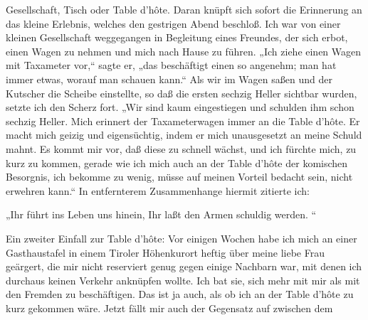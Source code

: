 \documentclass[twoside=true,titlepage=false,open=any, parskip=never, fontsize=10pt, headings=small, chapterprefix=false, appendixprefix=false]{scrbook}
\begin{document}
            
        \pstart
        Gesellschaft, Tisch oder Table d’hôte. Daran
               knüpft sich sofort die Erinnerung an das kleine Erlebnis, welches den
               gestrigen Abend beschloß. Ich war von einer kleinen Gesellschaft weggegangen in
               Begleitung eines Freundes, der sich erbot, einen Wagen zu nehmen und mich nach
               Hause zu führen. „Ich ziehe einen Wagen mit Taxameter vor,“ sagte er, „das
               beschäftigt einen so angenehm; man hat immer etwas, worauf man schauen
               kann.“ Als wir im Wagen saßen und der Kutscher die Scheibe einstellte, so daß
               die ersten sechzig Heller sichtbar wurden, setzte ich den Scherz fort. „Wir sind
               kaum eingestiegen und schulden ihm schon sechzig Heller. Mich erinnert der
               Taxameterwagen immer an die Table d’hôte. Er
               macht mich geizig und eigensüchtig, indem er mich unausgesetzt an
               meine Schuld mahnt. Es kommt mir vor, daß diese zu schnell wächst, und ich
               fürchte mich, zu kurz zu kommen, gerade wie ich mich auch an der
               Table d’hôte der komischen Besorgnis, ich bekomme zu
               wenig, müsse auf meinen Vorteil bedacht sein, nicht erwehren kann.“ In
               entfernterem Zusammenhange hiermit zitierte ich:
        \pend
    
            
        \pstart
        „Ihr führt ins Leben uns hinein,
                  Ihr laßt den Armen schuldig werden.
    “
        \pend
    
            
        \pstart
        Ein zweiter Einfall zur Table d’hôte: Vor einigen Wochen habe ich mich an einer
                  Gasthaustafel in einem Tiroler Höhenkurort
               heftig über meine liebe Frau geärgert, die mir nicht reserviert genug gegen
               einige Nachbarn war, mit denen ich durchaus keinen Verkehr anknüpfen
               wollte. Ich bat sie, sich mehr mit mir als mit den Fremden zu beschäftigen. Das
               ist ja auch, als ob ich an der Table d’hôte zu kurz
                  gekommen wäre. Jetzt fällt mir auch der Gegensatz auf zwischen dem
        \pend
    
         
            
            
            
\end{document}
